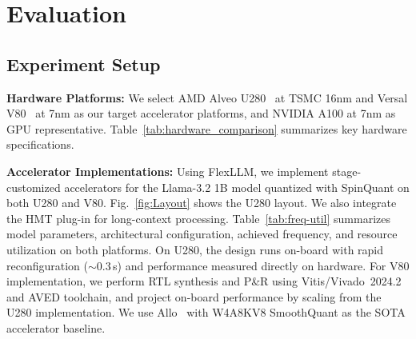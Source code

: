 \documentclass[conference]{IEEEtran}
\begin{document}
\section{Evaluation}

\subsection{Experiment Setup}

\textbf{Hardware Platforms:}  
We select AMD Alveo U280~\cite{amd_u280_ds} at TSMC 16nm and Versal V80~\cite{amd_versal_v80_ds} at 7nm as our target accelerator platforms, and NVIDIA A100 at 7nm as GPU representative.
Table~\ref{tab:hardware_comparison} summarizes key hardware specifications.




\textbf{Accelerator Implementations:}  
 Using FlexLLM, we implement stage-customized accelerators for the Llama-3.2 1B model quantized with SpinQuant on both U280 and V80. Fig.~\ref{fig:Layout} shows the U280 layout. We also integrate the HMT plug-in for long-context processing. Table~\ref{tab:freq-util} summarizes model parameters, architectural configuration, achieved frequency, and resource utilization on both platforms. On U280, the design runs on-board with rapid reconfiguration ($\sim$0.3\,s) and performance measured directly on hardware. For V80 implementation, we perform RTL synthesis and P\&R using Vitis/Vivado~2024.2 and AVED toolchain, and project on-board performance by scaling from the U280 implementation. We use Allo~\cite{chen2024allo} with W4A8KV8 SmoothQuant as the SOTA accelerator baseline.
\end{document}
